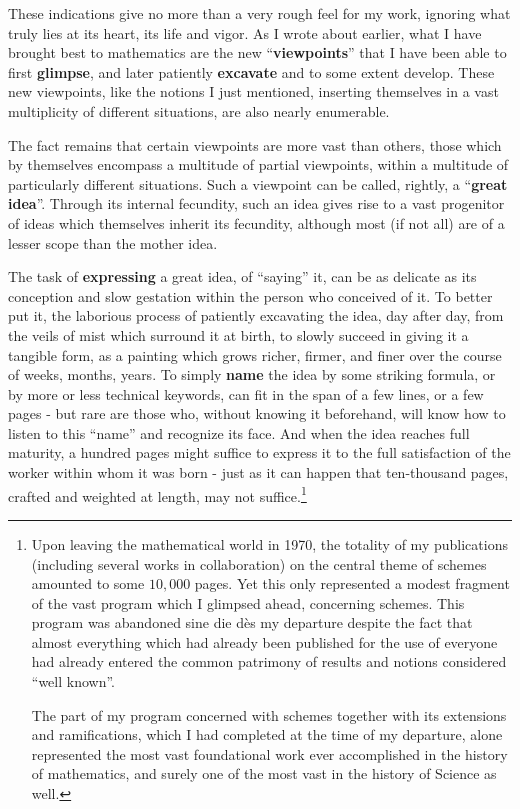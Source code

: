 These indications give no more than a very rough feel for my work, 
ignoring what truly lies at its heart, its life and vigor. 
As I wrote about earlier, what I have brought best to mathematics are the new 
``\textbf{viewpoints}'' that I have been able to first \textbf{glimpse}, and later patiently
\textbf{excavate} and to some extent develop. 
These new viewpoints, like the notions I just mentioned, inserting themselves in a vast
multiplicity of different situations, are also nearly enumerable. 

The fact remains that
certain viewpoints are more vast than others, 
those which by themselves encompass a multitude of partial viewpoints, within a multitude
of particularly different situations. Such a viewpoint can be called, rightly, a
``\textbf{great idea}''.
Through its internal fecundity, such an idea gives rise to a vast 
progenitor of ideas which themselves inherit its fecundity, although most (if not all)
are of a lesser scope than the mother idea. 

The task of \textbf{expressing} a great idea, 
of ``saying'' it, can be as delicate as its conception and slow gestation within the
person who conceived of it. To better put it, the 
laborious process of patiently excavating the idea, day after day, from the veils of mist
which surround it at birth, to slowly succeed
in giving it a tangible form, as a painting
which grows richer, firmer, and finer over the course of weeks, months, years.
To simply \textbf{name} the idea by some striking formula, or by more or less technical
keywords, can fit in the span of a few lines, or a few pages - 
but rare are those who, without knowing it beforehand, will know how to listen to this
``name'' and recognize its face. 
And when the idea reaches full maturity, a hundred pages might suffice to express it to
the full satisfaction of the worker within whom it was born - just as it can happen that
ten-thousand pages, 
crafted and weighted at length, may not suffice.\footnote{Upon leaving the mathematical
world in 1970, the totality of my publications (including several works in collaboration)
on the central theme of schemes amounted to some $10,000$ pages. Yet this only represented
a modest fragment of the vast program which I glimpsed ahead, concerning schemes.
This program was abandoned sine die d\`es my departure despite the fact that almost
everything which had already been published for the use of everyone had already entered
the common patrimony of results and notions considered ``well known''.

The part of my program concerned with schemes together with its extensions and
ramifications, which I had completed at the time of my departure, alone represented 
the most vast foundational work ever accomplished in the history of mathematics,
and surely one of the most vast in the history of Science as well.}

